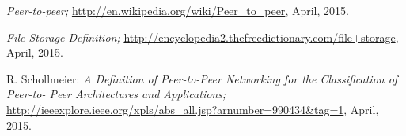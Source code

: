 \begin{thebibliography}{99}
		\emph{Peer-to-peer;}
		\url{http://en.wikipedia.org/wiki/Peer_to_peer},
		April, 2015.
		
		\emph{File Storage Definition;}
		\url{http://encyclopedia2.thefreedictionary.com/file+storage},
		April, 2015.
		
		R. Schollmeier:
		\emph{A Definition of Peer-to-Peer Networking for the Classification of Peer-to- Peer Architectures and Applications;}
		\url{http://ieeexplore.ieee.org/xpls/abs_all.jsp?arnumber=990434&tag=1},
		April, 2015.

\end{thebibliography}